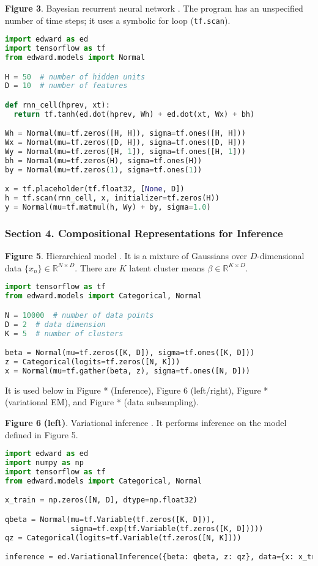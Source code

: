 \textbf{Figure 3}. Bayesian recurrent neural network \citep{neal2012bayesian}.
The program has an unspecified number of time steps; it uses a
symbolic for loop (\texttt{tf.scan}).
\begin{lstlisting}[language=python]
import edward as ed
import tensorflow as tf
from edward.models import Normal

H = 50  # number of hidden units
D = 10  # number of features

def rnn_cell(hprev, xt):
  return tf.tanh(ed.dot(hprev, Wh) + ed.dot(xt, Wx) + bh)

Wh = Normal(mu=tf.zeros([H, H]), sigma=tf.ones([H, H]))
Wx = Normal(mu=tf.zeros([D, H]), sigma=tf.ones([D, H]))
Wy = Normal(mu=tf.zeros([H, 1]), sigma=tf.ones([H, 1]))
bh = Normal(mu=tf.zeros(H), sigma=tf.ones(H))
by = Normal(mu=tf.zeros(1), sigma=tf.ones(1))

x = tf.placeholder(tf.float32, [None, D])
h = tf.scan(rnn_cell, x, initializer=tf.zeros(H))
y = Normal(mu=tf.matmul(h, Wy) + by, sigma=1.0)
\end{lstlisting}

\subsubsection{Section 4. Compositional Representations for Inference}

\textbf{Figure 5}. Hierarchical model \citep{gelman2006data}.
  It is a mixture of Gaussians over
  $D$-dimensional data $\{x_n\}\in\mathbb{R}^{N\times D}$. There are
  $K$ latent cluster means $\beta\in\mathbb{R}^{K\times D}$.
\begin{lstlisting}[language=python]
import tensorflow as tf
from edward.models import Categorical, Normal

N = 10000  # number of data points
D = 2  # data dimension
K = 5  # number of clusters

beta = Normal(mu=tf.zeros([K, D]), sigma=tf.ones([K, D]))
z = Categorical(logits=tf.zeros([N, K]))
x = Normal(mu=tf.gather(beta, z), sigma=tf.ones([N, D]))
\end{lstlisting}
It is used below in Figure * (Inference), Figure 6 (left/right),
Figure * (variational EM), and Figure * (data subsampling).

\textbf{Figure 6} \textbf{(left)}. Variational inference
\citep{jordan1999introduction}.
It performs inference on the model defined in Figure 5.
\begin{lstlisting}[language=python]
import edward as ed
import numpy as np
import tensorflow as tf
from edward.models import Categorical, Normal

x_train = np.zeros([N, D], dtype=np.float32)

qbeta = Normal(mu=tf.Variable(tf.zeros([K, D])),
               sigma=tf.exp(tf.Variable(tf.zeros([K, D]))))
qz = Categorical(logits=tf.Variable(tf.zeros([N, K])))

inference = ed.VariationalInference({beta: qbeta, z: qz}, data={x: x_train})
\end{lstlisting}

